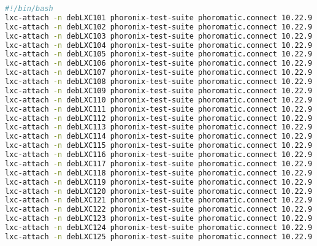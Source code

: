 \documentclass[french]{article}
\begin{document}
\begin{lstlisting}[language=bash,caption={}]
#!/bin/bash
lxc-attach -n debLXC101 phoronix-test-suite phoromatic.connect 10.22.9.17:8080/IVENVZ &
lxc-attach -n debLXC102 phoronix-test-suite phoromatic.connect 10.22.9.17:8080/IVENVZ &
lxc-attach -n debLXC103 phoronix-test-suite phoromatic.connect 10.22.9.17:8080/IVENVZ & 
lxc-attach -n debLXC104 phoronix-test-suite phoromatic.connect 10.22.9.17:8080/IVENVZ &
lxc-attach -n debLXC105 phoronix-test-suite phoromatic.connect 10.22.9.17:8080/IVENVZ &
lxc-attach -n debLXC106 phoronix-test-suite phoromatic.connect 10.22.9.17:8080/IVENVZ &
lxc-attach -n debLXC107 phoronix-test-suite phoromatic.connect 10.22.9.17:8080/IVENVZ &
lxc-attach -n debLXC108 phoronix-test-suite phoromatic.connect 10.22.9.17:8080/IVENVZ &
lxc-attach -n debLXC109 phoronix-test-suite phoromatic.connect 10.22.9.17:8080/IVENVZ &
lxc-attach -n debLXC110 phoronix-test-suite phoromatic.connect 10.22.9.17:8080/IVENVZ &
lxc-attach -n debLXC111 phoronix-test-suite phoromatic.connect 10.22.9.17:8080/IVENVZ &
lxc-attach -n debLXC112 phoronix-test-suite phoromatic.connect 10.22.9.17:8080/IVENVZ &
lxc-attach -n debLXC113 phoronix-test-suite phoromatic.connect 10.22.9.17:8080/IVENVZ &
lxc-attach -n debLXC114 phoronix-test-suite phoromatic.connect 10.22.9.17:8080/IVENVZ &
lxc-attach -n debLXC115 phoronix-test-suite phoromatic.connect 10.22.9.17:8080/IVENVZ &
lxc-attach -n debLXC116 phoronix-test-suite phoromatic.connect 10.22.9.17:8080/IVENVZ &
lxc-attach -n debLXC117 phoronix-test-suite phoromatic.connect 10.22.9.17:8080/IVENVZ &
lxc-attach -n debLXC118 phoronix-test-suite phoromatic.connect 10.22.9.17:8080/IVENVZ &
lxc-attach -n debLXC119 phoronix-test-suite phoromatic.connect 10.22.9.17:8080/IVENVZ &
lxc-attach -n debLXC120 phoronix-test-suite phoromatic.connect 10.22.9.17:8080/IVENVZ &
lxc-attach -n debLXC121 phoronix-test-suite phoromatic.connect 10.22.9.17:8080/IVENVZ &
lxc-attach -n debLXC122 phoronix-test-suite phoromatic.connect 10.22.9.17:8080/IVENVZ &
lxc-attach -n debLXC123 phoronix-test-suite phoromatic.connect 10.22.9.17:8080/IVENVZ &
lxc-attach -n debLXC124 phoronix-test-suite phoromatic.connect 10.22.9.17:8080/IVENVZ &
lxc-attach -n debLXC125 phoronix-test-suite phoromatic.connect 10.22.9.17:8080/IVENVZ &
\end{lstlisting}
\end{document}

